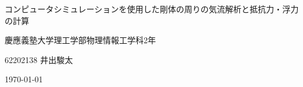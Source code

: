 \documentclass[main]{subfiles}
\begin{document}
\begin{titlepage}
    \centering
    \Large
    コンピュータシミュレーションを使用した剛体の周りの気流解析と抵抗力・浮力の計算

    \normalsize
    \vspace{10pt}
    慶應義塾大学理工学部物理情報工学科2年

    62202138 井出駿太

    \vspace{10pt}
    \today

\end{titlepage}
\end{document}
